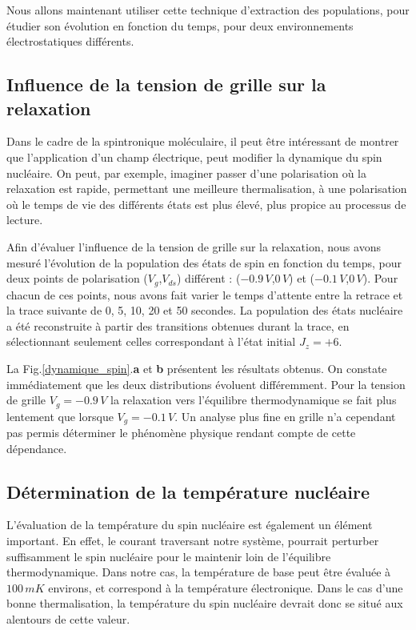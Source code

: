 Nous allons maintenant utiliser cette technique d'extraction des populations, pour étudier son évolution en fonction du temps, pour deux environnements électrostatiques différents.

\subsection{Influence de la tension de grille sur la relaxation}
Dans le cadre de la spintronique moléculaire, il peut \^etre intéressant de montrer que l'application d'un champ électrique, peut modifier la dynamique du spin nucléaire. On peut, par exemple, imaginer passer d'une polarisation où la relaxation est rapide, permettant une meilleure thermalisation, à une polarisation où le temps de vie des différents états est plus élevé, plus propice au processus de lecture.

Afin d'évaluer l'influence de la tension de grille sur la relaxation, nous avons mesuré l'évolution de la population des états de spin en fonction du temps, pour deux points de polarisation ($V_g$,$V_{ds}$) différent : ($-0.9\, V$,$0\, V$) et ($-0.1\, V$,$0\, V$). Pour chacun de ces points, nous avons fait varier le temps d'attente entre la retrace et la trace suivante de 0, 5, 10, 20 et 50 secondes. La population des états nucléaire a été reconstruite à partir des transitions obtenues durant la trace, en sélectionnant seulement celles correspondant à l'état initial $J_z=+6$.

La Fig.\ref{dynamique_spin}.\textbf{a} et \textbf{b} présentent les résultats obtenus. On constate immédiatement que les deux distributions évoluent différemment. Pour la tension de grille $V_g = -0.9\,V$ la relaxation vers l'équilibre thermodynamique se fait plus lentement que lorsque $V_g = -0.1\,V$. Un analyse plus fine en grille n'a cependant pas permis déterminer le phénomène physique rendant compte de cette dépendance.

\subsection{Détermination de la température nucléaire}
L'évaluation de la température du spin nucléaire est également un élément important. En effet, le courant traversant notre système, pourrait perturber suffisamment le spin nucléaire pour le maintenir loin de l'équilibre thermodynamique. Dans notre cas, la température de base peut \^etre évaluée à $100\,mK$ environs, et correspond à la température électronique. Dans le cas d'une bonne thermalisation, la température du spin nucléaire devrait donc se situé aux alentours de cette valeur.

